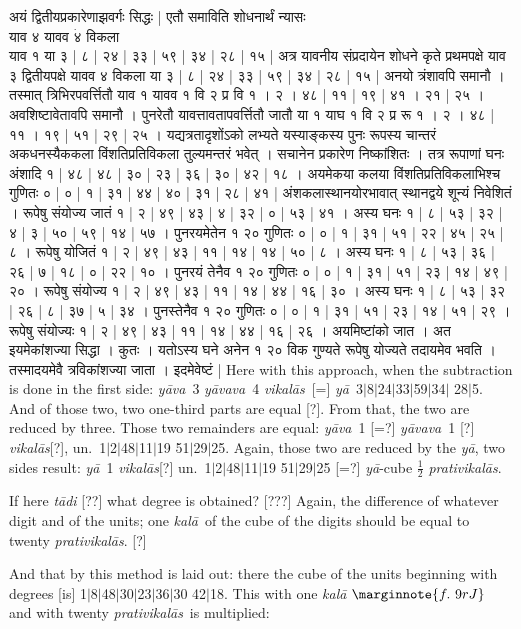 \documentclass[11pt,a5paper]{book}
\def\kala{\textit{ka\-l\=a}}
\def\prativikalas{\textit{prati\-vi\-ka\-l\=as}}
\def\ya{\textit{y\=a}}
\def\yava{\textit{y\=ava}}
\def\yavava{\textit{y\=avava}}
\def\vikalas{\textit{vi\-ka\-l\=as}}
\def\danda{$|$}
\begin{document}
\newpage
{\s अयं द्वितीयप्रकारेणाझवर्गः सिद्धः | एतौ समाविति शोधनार्थं न्यासः \\ 
याव ४ यावव $\dot{४}$ विकला \\
याव १ या ३ | ८ | २४ | ३३ | ५९ | ३४ | २८ | १५ | अत्र यावनीय 
संप्रदायेन शोधने कृते प्रथमपक्षे याव ३ द्वितीयपक्षे यावव ४ विकला या ३ | ८ | २४ |
३३ | ५९ | ३४ | २८ | १५ | अनयो त्रंशावपि समानौ ।
तस्मात् त्रिभिरपवर्त्तितौ याव १ यावव १ वि २ प्र वि १ । २ । ४८ | ११ |
१९ | ४१ । २१ | २५ । अवशिष्टावेतावपि समानौ । 
पुनरेतौ यावत्तावतापवर्त्तितौ जातौ या १ याघ १ वि २ प्र रू १ । २ । ४८ | ११ । १९ | ५१ | २९ | २५ । 
यद्यत्रतादृशोंऽको लभ्यते यस्याङ्कस्य पुनः रूपस्य चान्तरं अकधनस्यैककला विंशतिप्रतिविकला तुल्यमन्तरं भवेत् ।
सचानेन प्रकारेण निष्कांशितः । तत्र रूपाणां घनः अंशादि १ | ४८ | ४८ | ३० | २३ | ३६ | ३० | ४२ | १८ । 
अयमेकया कलया विंशतिप्रतिविकलाभिश्च गुणितः ० | ० | १ | ३१ | ४४ | ४० | ३१ | २८ | ४१ | 
अंशकलास्थानयोरभावात् स्थानद्वये शून्यं निवेशितं । 
रूपेषु संयोज्य जातं १ | २ | ४९ | ४३ | ४ | ३२ | ० | ५३ | ४१ । 
अस्य घनः १ | ८ | ५३ | ३२ | ४ | ३ | ५० | ५९ | १४ | ५७ । 
पुनरयमेतेन १ २० गुणितः ० | ० | १ | ३१ | ५१ | २२ | ४५ | २५ | ८ । 
रूपेषु योजितं १ | २ | ४९ | ४३ | ११ | १४ | १४ | ५० | ८ । 
अस्य घनः १ | ८ | ५३ | ३६ | २६ | ७ | १८ | ० | २२ | १० । 
पुनरयं तेनैव १ २० गुणितः ० | ० | १ | ३१ | ५१ | २३ | १४ | ४९ | २० । 
रूपेषु संयोज्य १ | २ | ४९ | ४३ | ११ | १४ | ४४ | १६ | ३० । 
अस्य घनः १ | ८ | ५३ | ३२ | २६ | ८ | ३७ | ५ | ३४ । 
पुनस्तेनैव १ २० गुणितः ० | ० | १ | ३१ | ५१ | २३ | १४ | ५१ | २९ ।
रूपेषु संयोज्यः १ | २ | ४९ | ४३ | ११ | १४ | ४४ | १६ | २६ । 
अयमिष्टांको जात । अत इयमेकांशज्या सिद्धा । कुतः । यतोऽस्य घने अनेन १ २० विक 
गुण्यते रूपेषु योज्यते तदायमेव भवति । तस्मादयमेवै त्रविकांशज्या जाता । इदमेवेष्टं |}
\newpage
Here with this approach, when the subtraction is done in the first side:
\yava\ 3 \yavava\ 4 \vikalas\ [=] \ya\ 3\danda 8\danda 24\danda 33\danda 59\danda 34\danda
28\danda 5. And of those two, two one-third parts are equal [?]. 
From that, the two are reduced by three. Those two remainders are equal:
\yava\ 1 [=?] \yavava\ 1 [?] \vikalas [?], un.\ 1\danda 2\danda 48\danda 11\danda 19
51\danda 29\danda 25.
Again, those two are reduced by the \ya, two sides result: 
\ya\ 1 \vikalas [?] un.\  1\danda 2\danda 48\danda 11\danda 19
51\danda 29\danda 25 [=?] \ya-cube $\frac{1}{2}$ \prativikalas.

If here \textit{t\=adi} [??] what degree is obtained?  [???] 
Again, the difference of whatever digit and of the units; one \kala\ of the cube of the digits
should be equal to twenty \prativikalas. [?]

And that by this method is laid out: there the cube of the units beginning with degrees [is]
1\danda 8\danda 48\danda 30\danda 23\danda 36\danda 30 42\danda 18.
This with one \kala
$\marginnote{f.~9r J}$
and with twenty \prativikalas\ is multiplied: 
\end{document}
